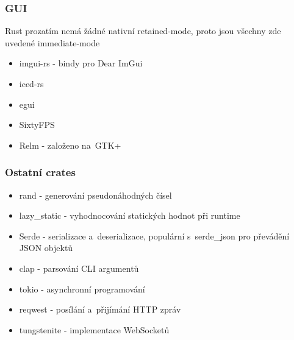 \documentclass[a4paper, 12pt]{article} %
\begin{document}
		\subsubsection*{GUI}
			Rust prozatím nemá žádné nativní retained-mode, proto jsou všechny zde uvedené immediate-mode
			\begin{itemize} 
				\item imgui-rs - bindy pro Dear ImGui
				\item iced-rs
				\item egui
				\item SixtyFPS
				\item Relm - založeno na~GTK+
			\end{itemize}


		\subsubsection*{Ostatní crates}
			\begin{itemize}
				\item rand - generování pseudonáhodných čísel
				\item lazy\_static - vyhodnocování statických hodnot při runtime
				\item Serde - serializace a~deserializace, populární s~serde\_json pro převádění JSON objektů
				\item clap - parsování CLI argumentů
				\item tokio - asynchronní programování
				\item reqwest - posílání a~přijímání HTTP zpráv
				\item tungstenite - implementace WebSocketů
			\end{itemize}
\end{document}
